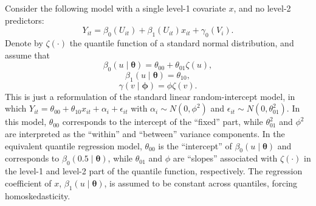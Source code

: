 \documentclass[12pt]{article}
\def\thetavec{\bm{\theta}}
\def\phivec{\bm{\phi}}
\def\bvec{\bm{b}}
\def\cvec{\bm{c}}
\begin{document}
Consider the following model with a single level-1 covariate $x$, and no level-2 predictors:
$$Y_{it} = \beta_0(U_{it}) + \beta_1(U_{it})x_{it} + \gamma_0(V_i).$$
Denote by $\zeta(\cdot)$ the quantile function of a standard normal distribution, and assume that
$$\beta_0(u\mid\thetavec) = \theta_{00} + \theta_{01}\zeta(u),$$
$$\beta_1(u\mid\thetavec) = \theta_{10},$$
$$\gamma(v \mid\phivec) = \phi \zeta(v).$$
This is just a reformulation of the standard linear random-intercept model, in which
$Y_{it} = \theta_{00} + \theta_{10}x_{it} + \alpha_i + \epsilon_{it}$ with $\alpha_i \sim N(0,\phi^2)$
and $\epsilon_{it} \sim N(0,\theta_{01}^2)$. In this model, 
$\theta_{00}$ corresponds to the intercept of the ``fixed'' part, while $\theta_{01}^2$ and $\phi^2$ are interpreted 
as the ``within'' and ``between'' variance components. In the equivalent quantile regression model, $\theta_{00}$ is the ``intercept'' of $\beta_0(u\mid\thetavec)$
and corresponds to $\beta_0(0.5\mid\thetavec)$, while $\theta_{01}$ and $\phi$ are ``slopes'' associated with $\zeta(\cdot)$ in the level-1 and level-2 
part of the quantile function, respectively. The regression coefficient of $x$, 
$\beta_1(u\mid\thetavec)$, is assumed to be constant across quantiles, forcing homoskedasticity.
\end{document}
